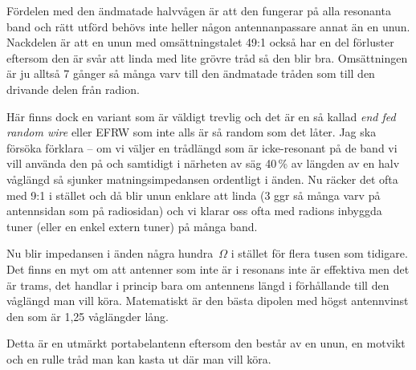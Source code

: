Fördelen med den ändmatade halvvågen är att den fungerar på alla
resonanta band och rätt utförd behövs inte heller någon
antennanpassare annat än en unun. Nackdelen är att en unun med
omsättningstalet 49:1 också har en del förluster eftersom den är svår
att linda med lite grövre tråd så den blir bra. Omsättningen är ju
alltså 7 gånger så många varv till den ändmatade tråden som till den
drivande delen från radion.

Här finns dock en variant som är väldigt trevlig och det är en så
kallad {\it end fed random wire} eller EFRW som inte alls är så random
som det låter. Jag ska försöka förklara -- om vi väljer en trådlängd
som är icke-resonant på de band vi vill använda den på och samtidigt i
närheten av säg 40\,\% av längden av en halv våglängd så sjunker
matningsimpedansen ordentligt i änden. Nu räcker det ofta med 9:1 i
stället och då blir unun enklare att linda (3 ggr så många varv på
antennsidan som på radiosidan) och vi klarar oss ofta med radions
inbyggda tuner (eller en enkel extern tuner) på många band.

Nu blir impedansen i änden några hundra~$\Omega$ i stället för flera
tusen som tidigare. Det finns en myt om att antenner som inte är i
resonans inte är effektiva men det är trams, det handlar i princip
bara om antennens längd i förhållande till den våglängd man vill
köra. Matematiskt är den bästa dipolen med högst antennvinst den som
är 1,25 våglängder lång.

Detta är en utmärkt portabelantenn eftersom den består av en unun, en
motvikt och en rulle tråd man kan kasta ut där man vill köra.

